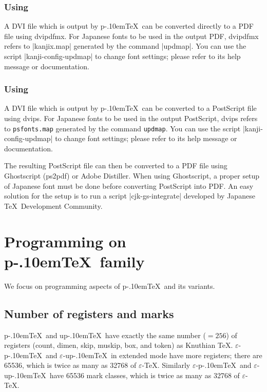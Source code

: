 \documentclass[a4paper,11pt,dvipdfmx]{article}
\let\emph=\origemph
\def\code#1{\texttt{#1}}
\def\eTeXpre{$\varepsilon$-}
\def\eTeX{\leavevmode\hbox{\eTeXpre\TeX}}
\def\epTeX{\leavevmode\hbox{\eTeXpre\pTeX}}
\def\eupTeX{\leavevmode\hbox{\eTeXpre\upTeX}}
\def\pTeX{p\kern-.10em\TeX}\def\upTeX{u\pTeX}
\begin{document}
\subsubsection{Using \emph{dvipdfmx}}

A DVI file which is output by \pTeX\ can be converted directly to a PDF file
using dvipdfmx.
For Japanese fonts to be used in the output PDF, dvipdfmx refers to
|kanjix.map| generated by the command |updmap|.
You can use the script |kanji-config-updmap| to change font settings;
please refer to its help message or documentation.

\subsubsection{Using \emph{dvips}}

A DVI file which is output by \pTeX\ can be converted to a PostScript file
using dvips.
For Japanese fonts to be used in the output PostScript, dvips refers to
\code{psfonts.map} generated by the command \code{updmap}.
You can use the script |kanji-config-updmap| to change font settings;
please refer to its help message or documentation.

The resulting PostScript file can then be converted to
a PDF file using Ghostscript (ps2pdf) or Adobe Distiller.
When using Ghostscript, a proper setup of Japanese font must be done
before converting PostScript into PDF.
An easy solution for the setup is to run a script |cjk-gs-integrate|
developed by Japanese \TeX\ Development Community.

\section{Programming on \pTeX\ family}

We focus on programming aspects of \pTeX\ and its variants.

\subsection{Number of registers and marks}

\pTeX\ and \upTeX\ have exactly the same number ($=256$) of registers
(count, dimen, skip, muskip, box, and token) as Knuthian \TeX.
\epTeX\ and \eupTeX\ in extended mode have more registers;
there are 65536, which is twice as many as 32768 of \eTeX.
Similarly \epTeX\ and \eupTeX\ have 65536 mark classes,
which is twice as many as 32768 of \eTeX.
\end{document}
